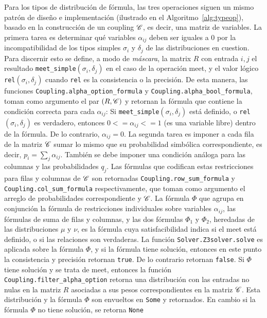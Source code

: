 Para los tipos de distribución de fórmula, las tres operaciones siguen
un mismo patrón de diseño e implementación (ilustrado en el Algoritmo~\ref{alg:typeop}), basado en la construcción
de un coupling $\mathscr{C}$, es decir, una matriz de variables. La
primera tarea es determinar qué variables $\alpha_{ij}$ deben ser
iguales a 0 por la incompatibilidad de los tipos simples $\sigma_i$ y
$\delta_j$ de las distribuciones en cuestion. Para discernir esto se
define, a modo de \emph{máscara}, la matrix $R$ con entrada $i,j$ el
resultado \verb|meet_simple|$(\sigma_i,\delta_j)$ en el caso de la
operación meet, y el valor lógico \verb|rel|$(\sigma_i,\delta_j)$
cuando \verb|rel| es la consistencia o la precisión. De esta manera,
las funciones \verb|Coupling.alpha_option_formula| y
\verb|Coupling.alpha_bool_formula|, toman como argumento el par
$(R,\mathscr{C})$ y retornan la fórmula que contiene la condición
correcta para cada $\alpha_{ij}$: Si
\verb|meet_simple|$(\sigma_i,\delta_j)$ está definido, o
\verb|rel|$(\sigma_i,\delta_j)$ es verdadero, entonces
$0<=\alpha_{ij}<= 1$ (es una variable libre) dentro de la fórmula. De
lo contrario, $\alpha_{ij} = 0$. La segunda tarea es imponer a cada
fila de la matriz $\mathscr{C}$ sumar lo mismo que su probabilidad
simbólica correspondiente, es decir, $p_i = \sum_j\alpha_{ij}$. También
se debe imponer una condición análoga para las columnas y las
probabilidades $q_j$. Las fórmulas que codifican estas restricciones
para filas y columnas de $\mathscr{C}$ son retornadas
\verb|Coupling.row_sum_formula| y \verb|Coupling.col_sum_formula|
respectivamente, que toman como argumento el arreglo de probabilidades
correspondiente y $\mathscr{C}$. La fórmula $\Phi$ que agrupa en
conjunción la fórmula de restricciones individuales sobre variables
$\alpha_{ij}$, las fórmulas de suma de filas y columnas, y las dos
fórmulas $\Phi_1$ y $\Phi_2$, heredadas de las distribuciones $\mu$ y
$\nu$, es la fórmula cuya satisfacibilidad indica si el meet está definido,
o si las relaciones son verdaderas. La función
\verb|Solver.Z3solver.solve| es aplicada sobre la fórmula $\Phi$, y si
la fórmula tiene solución, entonces en este punto la consistencia y
precisión retornan \verb|true|. De lo contrario retornan
\verb|false|. Si $\Phi$ tiene solución y se trata de meet, entonces la
función \verb|Coupling.filter_alpha_option| retorna una distribución
con las entradas no nulas en la matriz $R$ asociadas a sus pesos
correspondientes en la matriz $\mathscr{C}$. Esta distribución y la
fórmula $\Phi$ son envueltos en \verb|Some| y retornados. En cambio si
la fórmula $\Phi$ no tiene solución, se retorna \verb|None|


